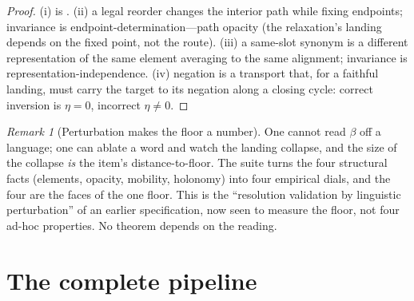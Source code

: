 \documentclass[11pt,a4paper]{article}
\theoremstyle{thmstyle}
\theoremstyle{definition}
\theoremstyle{remark}
\newtheorem{remark}[theorem]{Remark}
\newcommand{\flo}{\beta}               %
\newcommand{\hol}{\eta}                %
\begin{document}
\begin{proof}
\textup{(i)} is . \textup{(ii)} a legal
reorder changes the interior path while fixing endpoints; invariance is
endpoint-determination---path opacity (the relaxation's landing depends on the
fixed point, not the route). \textup{(iii)} a same-slot synonym is a different
representation of the same element averaging to the same alignment; invariance
is representation-independence. \textup{(iv)} negation is a transport that, for
a faithful landing, must carry the target to its negation along a closing
cycle: correct inversion is $\hol=0$, incorrect $\hol\neq0$.
\end{proof}

\begin{remark}[Perturbation makes the floor a number]
\label{rem:perturb-floor}
One cannot read $\flo$ off a language; one can ablate a word and watch the
landing collapse, and the size of the collapse \emph{is} the item's
distance-to-floor. The suite turns the four structural facts (elements,
opacity, mobility, holonomy) into four empirical dials, and the four are the
faces of the one floor. This is the ``resolution validation by linguistic
perturbation'' of an earlier specification, now seen to measure the floor, not
four ad-hoc properties. No theorem depends on the reading.
\end{remark}

\section{The complete pipeline}
\label{sec:pipeline}
\end{document}
